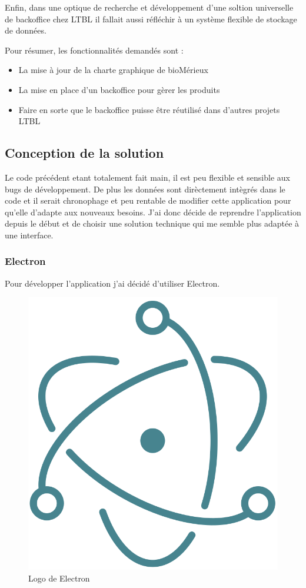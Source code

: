 Enfin, dans une optique de recherche et développement d'une soltion universelle de backoffice chez LTBL il fallait aussi réfléchir à un système flexible de stockage de données.

Pour résumer, les fonctionnalités demandés sont :

\begin{itemize}
    \item La mise à jour de la charte graphique de bioMérieux
    \item La mise en place d'un backoffice pour gèrer les produits
    \item Faire en sorte que le backoffice puisse être réutilisé dans d'autres projets LTBL
\end{itemize}


\subsection{Conception de la solution}

Le code précédent etant totalement fait main, il est peu flexible et sensible aux bugs de développement.
De plus les données sont dirèctement intègrés dans le code et il serait chronophage et peu rentable de modifier cette application pour qu'elle d'adapte aux nouveaux besoins.
J'ai donc décide de reprendre l'application depuis le début et de choisir une solution technique qui me semble plus adaptée à une interface.

\subsubsection{Electron}

Pour développer l'application j'ai décidé d'utiliser Electron.

\begin{figure}[h]
    \centering
    \includegraphics{img/electron.png}
    \caption{Logo de Electron}
\end{figure}

